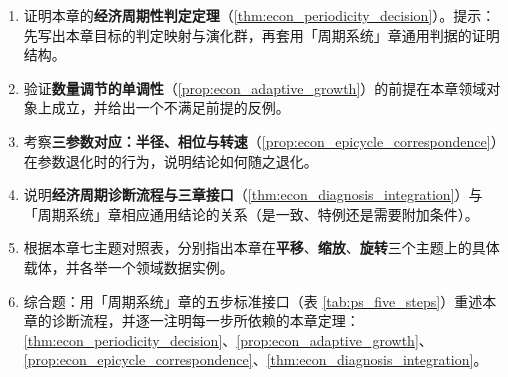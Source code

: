 \begin{enumerate}[leftmargin=3em, label=\textbf{题 \arabic*}]
    \item 证明本章的\textbf{经济周期性判定定理}（\ref{thm:econ_periodicity_decision}）。提示：先写出本章目标的判定映射与演化群，再套用「周期系统」章通用判据的证明结构。

    \item 验证\textbf{数量调节的单调性}（\ref{prop:econ_adaptive_growth}）的前提在本章领域对象上成立，并给出一个不满足前提的反例。

    \item 考察\textbf{三参数对应：半径、相位与转速}（\ref{prop:econ_epicycle_correspondence}）在参数退化时的行为，说明结论如何随之退化。

    \item 说明\textbf{经济周期诊断流程与三章接口}（\ref{thm:econ_diagnosis_integration}）与「周期系统」章相应通用结论的关系（是一致、特例还是需要附加条件）。

    \item 根据本章七主题对照表，分别指出本章在\textbf{平移}、\textbf{缩放}、\textbf{旋转}三个主题上的具体载体，并各举一个领域数据实例。

    \item 综合题：用「周期系统」章的五步标准接口（表 \ref{tab:ps_five_steps}）重述本章的诊断流程，并逐一注明每一步所依赖的本章定理：\ref{thm:econ_periodicity_decision}、\ref{prop:econ_adaptive_growth}、\ref{prop:econ_epicycle_correspondence}、\ref{thm:econ_diagnosis_integration}。
\end{enumerate}


